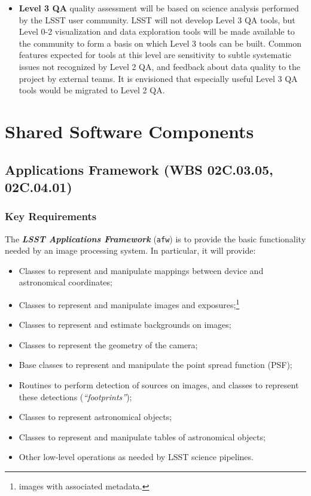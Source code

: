 \documentclass[12pt]{article}
\newcommand{\wbsAFW}{WBS 02C.03.05, 02C.04.01}
\begin{document}
\begin{itemize}
    \item {\bf Level 3 QA} quality assessment will be based on science analysis performed by the LSST user community. LSST will not develop Level 3 QA tools, but Level 0-2 visualization and data exploration tools will be made available to the community to form a basis on which Level 3 tools can be built. Common features expected for tools at this level are sensitivity to subtle systematic issues not recognized by Level 2 QA, and feedback about data quality to the project by external teams. It is envisioned that especially useful Level 3 QA tools would be migrated to Level 2 QA.

\end{itemize}

\clearpage

\section{Shared Software Components}

\subsection{Applications Framework (\wbsAFW)}

\subsubsection{Key Requirements}

The {\bf \emph{LSST Applications Framework}} ({\tt afw}) is to provide the basic functionality needed by an image processing system. In particular, it will provide:

\begin{itemize}
    \item Classes to represent and manipulate mappings between device and astronomical coordinates;
    \item Classes to represent and manipulate images and exposures;\footnote{images with associated metadata.}
    \item Classes to represent and estimate backgrounds on images;
    \item Classes to represent the geometry of the camera;
    \item Base classes to represent and manipulate the point spread function (PSF);
    \item Routines to perform detection of sources on images, and classes to represent these detections (\emph{``footprints''});
    \item Classes to represent astronomical objects;
    \item Classes to represent and manipulate tables of astronomical objects;
    \item Other low-level operations as needed by LSST science pipelines.
\end{itemize}
\end{document}
